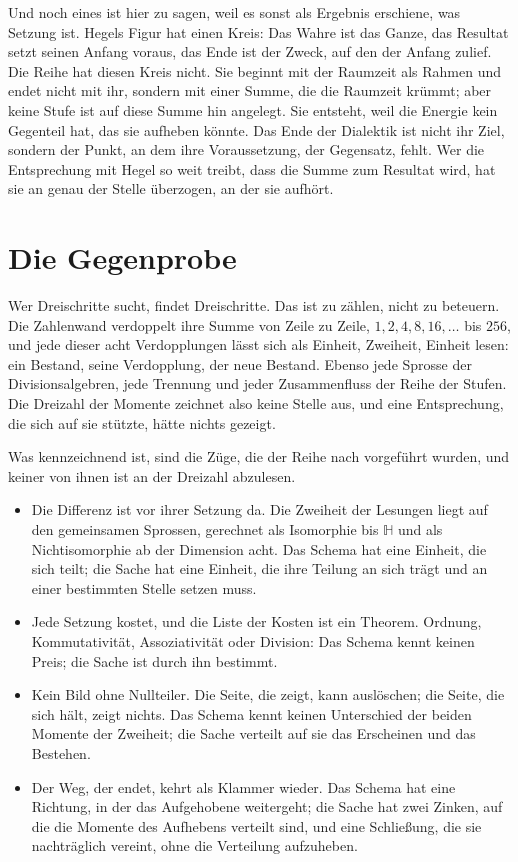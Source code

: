 \documentclass[11pt,a4paper]{article}
\newcommand{\HH}{\mathbb H}
\begin{document}
Und noch eines ist hier zu sagen, weil es sonst als Ergebnis erschiene, was Setzung ist. Hegels Figur hat einen Kreis: Das Wahre ist das Ganze, das Resultat setzt seinen Anfang voraus, das Ende ist der Zweck, auf den der Anfang zulief. Die Reihe hat diesen Kreis nicht. Sie beginnt mit der Raumzeit als Rahmen und endet nicht mit ihr, sondern mit einer Summe, die die Raumzeit krümmt; aber keine Stufe ist auf diese Summe hin angelegt. Sie entsteht, weil die Energie kein Gegenteil hat, das sie aufheben könnte. Das Ende der Dialektik ist nicht ihr Ziel, sondern der Punkt, an dem ihre Voraussetzung, der Gegensatz, fehlt. Wer die Entsprechung mit Hegel so weit treibt, dass die Summe zum Resultat wird, hat sie an genau der Stelle überzogen, an der sie aufhört.

\section{Die Gegenprobe}
\label{sec:gegenprobe}

Wer Dreischritte sucht, findet Dreischritte. Das ist zu zählen, nicht zu beteuern. Die Zahlenwand verdoppelt ihre Summe von Zeile zu Zeile, $1,2,4,8,16,\ldots$ bis $256$, und jede dieser acht Verdopplungen lässt sich als Einheit, Zweiheit, Einheit lesen: ein Bestand, seine Verdopplung, der neue Bestand. Ebenso jede Sprosse der Divisionsalgebren, jede Trennung und jeder Zusammenfluss der Reihe der Stufen. Die Dreizahl der Momente zeichnet also keine Stelle aus, und eine Entsprechung, die sich auf sie stützte, hätte nichts gezeigt.

Was kennzeichnend ist, sind die Züge, die der Reihe nach vorgeführt wurden, und keiner von ihnen ist an der Dreizahl abzulesen.

\begin{itemize}[leftmargin=1.6em,itemsep=2pt]
\item Die Differenz ist vor ihrer Setzung da. Die Zweiheit der Lesungen liegt auf den gemeinsamen Sprossen, gerechnet als Isomorphie bis $\HH$ und als Nichtisomorphie ab der Dimension acht. Das Schema hat eine Einheit, die sich teilt; die Sache hat eine Einheit, die ihre Teilung an sich trägt und an einer bestimmten Stelle setzen muss.
\item Jede Setzung kostet, und die Liste der Kosten ist ein Theorem. Ordnung, Kommutativität, Assoziativität oder Division: Das Schema kennt keinen Preis; die Sache ist durch ihn bestimmt.
\item Kein Bild ohne Nullteiler. Die Seite, die zeigt, kann auslöschen; die Seite, die sich hält, zeigt nichts. Das Schema kennt keinen Unterschied der beiden Momente der Zweiheit; die Sache verteilt auf sie das Erscheinen und das Bestehen.
\item Der Weg, der endet, kehrt als Klammer wieder. Das Schema hat eine Richtung, in der das Aufgehobene weitergeht; die Sache hat zwei Zinken, auf die die Momente des Aufhebens verteilt sind, und eine Schließung, die sie nachträglich vereint, ohne die Verteilung aufzuheben.
\end{itemize}
\end{document}
